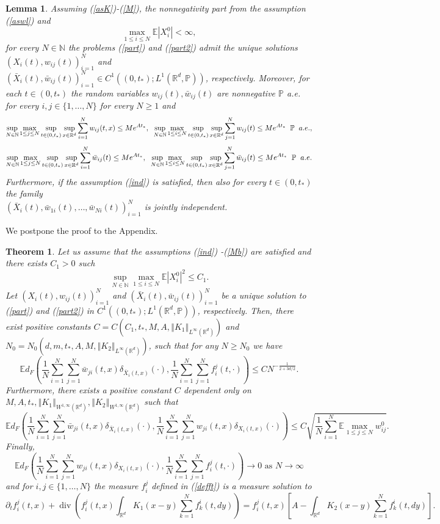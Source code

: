 \documentclass[10pt]{article}
\newtheorem{theo}{Theorem}
\newtheorem{lemma}{Lemma}
\def\divv{\operatorname {div}}
\newcommand{\eqq}[2]{\begin{equation}  #1  \label{#2}\end{equation}    }
\newcommand{\hd}{\hspace{0.2cm}}
\newcommand{\m}[1]{\mbox{#1}}
\newcommand*{\norm}[1]{\left\Vert{#1}\right\Vert}
\newcommand{\R}{\mathbb{R}}
\newcommand{\ird}{\int_{\mathbb{R}^d}}
\newcommand{\sn}{\frac{1}{N}\sum_{i=1}^N}
\newcommand{\xb}{\bar{X}}
\newcommand{\p}{\mathbb{P}}
\newcommand{\E}{\mathbb{E}}
\newcommand{\wij}{w_{ij}}
\newcommand{\wijb}{\bar{w}_{ij}}
\newcommand{\wji}{w_{ji}}
\newcommand{\wjib}{\bar{w}_{ji}}
\newcommand{\fji}{f^j_i}
\newcommand{\fik}{f^i_k}
\begin{document}
\begin{lemma}\label{exi}
Assuming (\ref{asK})-(\ref{M}), the nonnegativity part from the assumption (\ref{aswl}) and 
\[
 \max_{1\leq i\leq N}\mathbb{E}|X^0_i| < \infty,
\]
for every $N \in \mathbb{N}$ the problems (\ref{part}) and (\ref{part2}) admit the unique solutions $(X_i(t), \wij(t))_{i=1}^N$ and \\$(\xb_i(t),\wijb(t))_{i=1}^N \in C^{1}((0,t_*);L^{1}(\R^{d},\p))$, respectively. 
Moreover, for each $t\in (0,t_{*})$ the random variables $\wij(t), \wijb(t)$ are nonnegative $\p$ a.e. for every $i,j \in \{1,\dots,N\}$ for every $N \geq 1$ and
\[
\sup_{N\in \mathbb{N}}\max_{1\leq j\leq N}\sup_{t\in (0,t_*)} \sup_{x \in \R^d} \sum_{i=1}^N \wij(t,x) \leq Me^{At_*},\hd \sup_{N\in \mathbb{N}}\max_{1\leq i\leq N}\sup_{t\in (0,t_*)} \sup_{x \in \R^d} \sum_{j=1}^N \wij(t) \leq Me^{At_*}  \hd \p \hd  a.e., 
\]
\eqq{
\sup_{N\in \mathbb{N}}\max_{1\leq j\leq N}\sup_{t\in (0,t_*)}\sup_{x \in \R^d}  \sum_{i=1}^N \wijb(t) \leq Me^{At_*},\hd \sup_{N\in \mathbb{N}}\max_{1\leq i\leq N}\sup_{t\in (0,t_*)} \sup_{x \in \R^d} \sum_{j=1}^N \wijb(t) \leq Me^{At_*}  \hd \p \hd  a.e. 
}{Mbound}
Furthermore, if the assumption (\ref{ind}) is satisfied, then also for every $t \in (0,t_{*})$ the family \\
$(\xb_{i}(t),\bar{w}_{1i}(t),\dots,\bar{w}_{Ni}(t))_{i=1}^N$  is jointly independent. 
\end{lemma}

We postpone the proof to the Appendix.



\begin{theo}\label{mainprob}
Let us assume that the assumptions (\ref{ind}) -(\ref{Mb}) are satisfied and there exists $C_1 > 0$ such 
\eqq{
\sup_{N \in \mathbb{N}}\max_{1\leq i \leq N}\E|X_i^0|^2 \leq C_1.
}{ex}
Let $(X_i(t), \wij(t))_{i=1}^N$ and $(\xb_i(t),\wijb(t))_{i=1}^N$ be a unique solution to (\ref{part}) and (\ref{part2}) in $C^{1}((0,t_*);L^{1}(\R^{d},\p))$, respectively.  
Then, there exist  positive constants $C = C(C_1,t_*,M,A,\norm{K_1}_{L^{\infty} (\R^d)})$ and \\ $N_0 = N_0(d,m,t_*,A,M,\norm{K_2}_{L^{\infty} (\R^d)})$, such that  for any $N \geq N_0$ we have
\eqq{
\E d_{F}\left(\sn \sum_{j=1}^N\wjib(t,x)\delta_{\xb_i(t,x)}(\cdot),\frac{1}{N}\sum_{i=1}^N\sum_{j=1}^N \fji (t,\cdot)\right) \leq C N^{-\frac{1}{2+3d/2}}.
}{zGC}
Furthermore, there exists a positive constant $C$ dependent only on $M,A,t_*,\norm{K_{1}}_{W^{1,\infty}(\R^d)},\norm{K_{2}}_{W^{1,\infty}(\R^d)}$ such that
\eqq{
\E d_{F}\left(\sn \sum_{j=1}^N \wjib(t,x)\delta_{\xb_i(t,x)}(\cdot),\sn \sum_{j=1}^N \wji(t,x)\delta_{X_i(t,x)}(\cdot)\right)
\leq C \sqrt{\frac{1}{N}\sum_{i=1}^N\E \max_{1\leq j \leq N}w^0_{ij}}.
}{zEX}
Finally,
\eqq{
\E d_{F}\left(\sn \sum_{j=1}^N \wji(t,x)\delta_{X_i(t,x)}(\cdot),\frac{1}{N}\sum_{i=1}^N\sum_{j=1}^N \fji (t,\cdot)\right) \rightarrow 0 \m{ as } N\rightarrow \infty
}{finalp}
and for $i,j \in \{1,\dots,N\}$ the measure $\fji$ defined in (\ref{defft}) is a measure solution to
\eqq{
\partial_t \fji(t,x) + \divv\left(\fji(t,x)\ird K_{1}(x-y)\sum_{k=1}^N\fik(t,dy)\right) = \fji(t,x)\left[A - \ird K_{2}(x-y)\sum_{k=1}^N\fik(t,dy)\right].
}{semic}
\end{theo}
\end{document}
